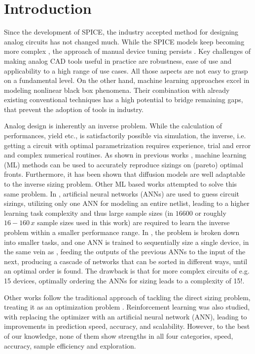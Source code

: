 \documentclass[conference]{IEEEtran}
\begin{document}
\section{Introduction}\label{sec:intro}
	Since the development of SPICE, the industry accepted method for designing analog circuits has not changed much. While the SPICE models keep becoming more complex \cite{gatermann22mosfet}, the approach of manual device tuning persists \cite{gielen23workshop}. Key challenges of making analog CAD tools useful in practice are robustness, ease of use and applicability to a high range of use cases. All those aspects are not easy to grasp on a fundamental level. On the other hand, machine learning approaches excel in modeling nonlinear black box phenomena. Their combination with already existing conventional techniques has a high potential to bridge remaining gaps, that prevent the adoption of tools in industry.
	
	Analog design is inherently an inverse problem. While the calculation of performances, yield etc., is satisfactorily possible via simulation, the inverse, i.e. getting a circuit with optimal parametrization requires experience, trial and error and complex numerical routines. As shown in previous works \cite{ leibl24inverse, lourenco19pareto}, machine learning (ML) methods can be used to accurately reproduce sizings on (pareto) optimal fronts. Furthermore, it has been shown \cite{eid24diffusion} that diffusion models are well adaptable to the inverse sizing problem. Other ML based works attempted to solve this same problem. In \cite{lourenco18}, artificial neural networks (ANNs) are used to guess circuit sizings, utilizing only one ANN for modeling an entire netlist, leading to a higher learning task complexity and thus large sample sizes (in \cite{lourenco18} $16600$ or roughly $16-160 \, x$ sample sizes used in this work) are required to learn the inverse problem within a smaller performance range. In \cite{beaulieu23cascaded}, the problem is broken down into smaller tasks, and one ANN is trained to sequentially size a single device, in the same vein as \cite{leibl24inverse}, feeding the outputs of the previous ANNs to the input of the next, producing a cascade of networks that can be sorted in different ways, until an optimal order is found. The drawback is that for more complex circuits of e.g. 15 devices, optimally ordering the ANNs for sizing leads to a complexity of 15!.
	
	Other works follow the traditional approach of tackling the direct sizing problem, treating it as an optimization problem \cite{fayazi23angel, budak23apostle, wolfe03nnmodel, hakhamaneshi23pretraining}. Reinforcement learning was also studied, with \cite{gao23rose, settaluri22reinforcement, zhang23multiagentRL}  replacing the optimizer with an artificial neural network (ANN), leading to improvements in prediction speed, accuracy, and scalability. 
	However, to the best of our knowledge, none of them show strengths in all four categories, speed, accuracy, sample efficiency and exploration.
	
\end{document}
